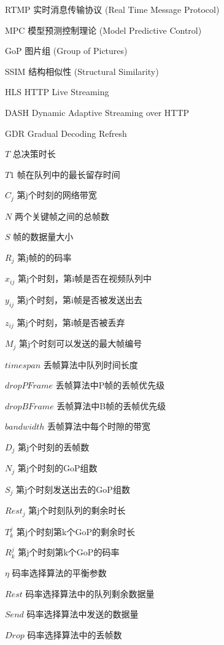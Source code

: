 \begin{denotation}[3cm]
\item[RTMP] 实时消息传输协议 (Real Time Message Protocol)
\item[MPC] 模型预测控制理论 (Model Predictive Control)
\item[GoP] 图片组 (Group of Pictures)
\item[SSIM] 结构相似性 (Structural Similarity)
\item[HLS] HTTP Live Streaming
\item[DASH] Dynamic Adaptive Streaming over HTTP
\item[GDR] Gradual Decoding Refresh
\item[$T$] 总决策时长 
\item[$T1$] 帧在队列中的最长留存时间
\item[$C_j$] 第j个时刻的网络带宽
\item[$N$]	两个关键帧之间的总帧数
\item[$S$] 帧的数据量大小
\item[$R_j$] 第j帧的的码率
\item[$x_{ij}$] 第j个时刻，第i帧是否在视频队列中
\item[$y_{ij}$] 第j个时刻，第i帧是否被发送出去
\item[$z_{ij}$] 第j个时刻，第i帧是否被丢弃
\item[$M_j$] 第j个时刻可以发送的最大帧编号
\item[$timespan$] 丢帧算法中队列时间长度
\item[$dropPFrame$] 丢帧算法中P帧的丢帧优先级
\item[$dropBFrame$] 丢帧算法中B帧的丢帧优先级
\item[$bandwidth$] 丢帧算法中每个时隙的带宽
\item[$D_j$] 第j个时刻的丢帧数
\item[$N_j$] 第j个时刻的GoP组数
\item[$S_j$] 第j个时刻发送出去的GoP组数
\item[$Rest_j$] 第j个时刻队列的剩余时长
\item[$T_k^j$] 第j个时刻第k个GoP的剩余时长 
\item[$R_k^j$] 第j个时刻第k个GoP的码率
\item[$\eta$] 码率选择算法的平衡参数
\item[$Rest$] 码率选择算法中的队列剩余数据量
\item[$Send$] 码率选择算法中发送的数据量
\item[$Drop$] 码率选择算法中的丢帧数
\end{denotation}
